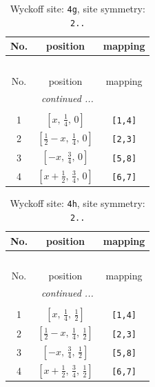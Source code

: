 \documentclass[fleqn,8pt]{jsarticle}
\begin{document}
\renewcommand{\arraystretch}{1.2}
\begin{longtable}{ccc}
\caption{Wyckoff site: {\tt 4g}, site symmetry: {\tt 2..}}
 \\
 \hline \hline
No. & position & mapping \\ \hline \endfirsthead

\multicolumn{2}{l}{\tablename\ \thetable{}} \\
 \hline \hline
No. & position & mapping \\ \hline \endhead

 \hline \hline
\multicolumn{2}{r}{\footnotesize\it continued ...} \\ \endfoot

 \hline \hline
\multicolumn{2}{r}{} \\ \endlastfoot

1 & $\left[ x,\, \frac{1}{4},\, 0 \right]$ & {\tt [1,4]} \\ \hline
2 & $\left[ \frac{1}{2} - x,\, \frac{1}{4},\, 0 \right]$ & {\tt [2,3]} \\ \hline
3 & $\left[ - x,\, \frac{3}{4},\, 0 \right]$ & {\tt [5,8]} \\ \hline
4 & $\left[ x + \frac{1}{2},\, \frac{3}{4},\, 0 \right]$ & {\tt [6,7]} \\
\end{longtable}
\renewcommand{\arraystretch}{1.2}
\begin{longtable}{ccc}
\caption{Wyckoff site: {\tt 4h}, site symmetry: {\tt 2..}}
 \\
 \hline \hline
No. & position & mapping \\ \hline \endfirsthead

\multicolumn{2}{l}{\tablename\ \thetable{}} \\
 \hline \hline
No. & position & mapping \\ \hline \endhead

 \hline \hline
\multicolumn{2}{r}{\footnotesize\it continued ...} \\ \endfoot

 \hline \hline
\multicolumn{2}{r}{} \\ \endlastfoot

1 & $\left[ x,\, \frac{1}{4},\, \frac{1}{2} \right]$ & {\tt [1,4]} \\ \hline
2 & $\left[ \frac{1}{2} - x,\, \frac{1}{4},\, \frac{1}{2} \right]$ & {\tt [2,3]} \\ \hline
3 & $\left[ - x,\, \frac{3}{4},\, \frac{1}{2} \right]$ & {\tt [5,8]} \\ \hline
4 & $\left[ x + \frac{1}{2},\, \frac{3}{4},\, \frac{1}{2} \right]$ & {\tt [6,7]} \\
\end{longtable}
\end{document}
